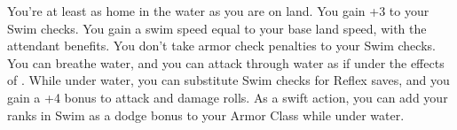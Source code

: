 {You're at least as home in the water as you are on land.}
{You gain +3 to your Swim checks.}
{You gain a swim speed equal to your base land speed, with the attendant benefits. You don't take armor check penalties to your Swim checks.}
{You can breathe water, and you can attack through water as if under the effects of .}
{While under water, you can substitute Swim checks for Reflex saves, and you gain a +4 bonus to attack and damage rolls.}
{As a swift action, you can add your ranks in Swim as a dodge bonus to your Armor Class while under water.}